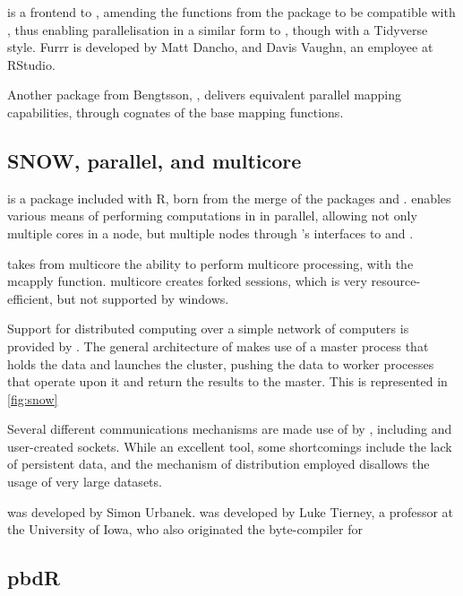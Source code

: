  is a frontend to , amending the functions from the package
 to be compatible with , thus enabling parallelisation in a
similar form to , though with a Tidyverse
style\cite{vaughan18}.
Furrr is developed by Matt Dancho, and Davis Vaughn, an employee at RStudio.

Another package from Bengtsson, , delivers equivalent parallel mapping capabilities, through cognates of the base \R{} mapping functions.

\subsection{SNOW, parallel, and multicore}\label{subsec:parall-snow-mult}

 is a package included with R, born from the merge of the
packages  and \cite{core:_packag}.  enables
various means of performing computations in \R{} in parallel, allowing not
only multiple cores in a node, but multiple nodes through 's
interfaces to  and \cite{tierney2018snow}.

 takes from multicore the ability to perform multicore
processing, with the mcapply function. multicore creates forked \R{}
sessions, which is very resource-efficient, but not supported by
windows.

Support for distributed computing over a simple network of computers is provided by .
The general architecture of  makes use of a master process that holds the data and launches the cluster, pushing the data to worker processes that operate upon it and return the results to the master.
This is represented in \cref{fig:snow}


Several different communications mechanisms are made use of by , including  and user-created sockets.
While an excellent tool, some shortcomings include the lack of persistent data, and the mechanism of distribution employed disallows the usage of very large datasets.

 was developed by Simon Urbanek.  was developed by Luke Tierney, a professor at the University of Iowa, who also originated the byte-compiler for \R{}

\subsection{pbdR}\label{subsec:pbdr}

